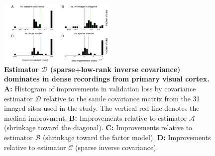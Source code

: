 \begin{figure}[htp]
\centering
\includegraphics[width=0.5\textwidth]{figures/Figure4.pdf}
\caption{{\bf Estimator $\mathcal D$ (sparse+low-rank inverse covariance) dominates in dense recordings from primary visual cortex.}
{\bf A:}  Histogram of improvements in validation loss by covariance estimator $\mathcal D$ relative to the samle covariance matrix from the 31 imaged sites used in the study.  The vertical red line denotes the median improvment. 
{\bf B:} Improvements relative to estimator $\mathcal A$ (shrinkage toward the diagonal).
{\bf C:} Improvements relative to estimator $\mathcal B$ (shrinkage toward the factor model).
{\bf D:} Improvements relative to estimator $\mathcal C$ (sparse inverse covariance).
}\label{fig:04}
\end{figure}